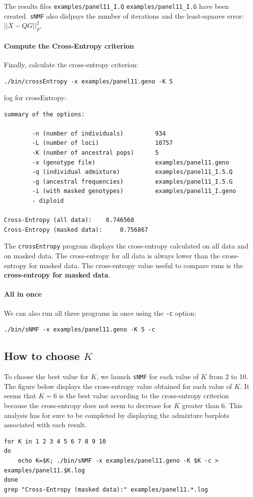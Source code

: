 \documentclass[10pt,a4paper]{article}
\begin{document}
\noindent
The results files \verb|examples/panel11_I.Q| \verb|examples/panel11_I.G| have been created.
{\tt sNMF} also dislpays the number of iterations and the least-squares error: $||X - QG||_F^2$.

\paragraph{Compute the Cross-Entropy criterion}

Finally, calculate the cross-entropy criterion:
\begin{Verbatim}[frame=single]
./bin/crossEntropy -x examples/panel11.geno -K 5
\end{Verbatim}
\noindent
log for crossEntropy:
\begin{Verbatim}[frame=single]
summary of the options:

        -n (number of individuals)         934
        -L (number of loci)                10757
        -K (number of ancestral pops)      5
        -x (genotype file)                 examples/panel11.geno
        -q (individual admixture)          examples/panel11_I.5.Q
        -g (ancestral frequencies)         examples/panel11_I.5.G
        -i (with masked genotypes)         examples/panel11_I.geno
        - diploid

Cross-Entropy (all data):	 0.746568
Cross-Entropy (masked data):	 0.756867
\end{Verbatim}
\noindent
The {\tt crossEntropy} program displays the cross-entropy calculated on all data and on masked data.
The cross-entropy for all data is always lower than the cross-entropy for masked data. The cross-entropy value 
useful to compare runs is the {\bf cross-entropy for masked data}.


\paragraph{All in once}
We can also run all three programs in once using the \verb|-c| option:
\begin{Verbatim}[frame=single]
./bin/sNMF -x examples/panel11.geno -K 5 -c
\end{Verbatim}

\subsection{How to choose $K$}

To choose the best value for $K$, we launch {\tt sNMF} for each value of $K$ from 2 to 10. The figure below displays the cross-entropy value obtained for each value of $K$. It seems that $K=6$ is the best value according to the cross-entropy criterion because the cross-entropy does not seem to decrease for $K$ greater than 6. This analysis has for sure to be completed by displaying the admixture barplots associated with each result. 
\begin{Verbatim}[frame=single]
for K in 1 2 3 4 5 6 7 8 9 10 
do 
	echo K=$K; ./bin/sNMF -x examples/panel11.geno -K $K -c > examples/panel11.$K.log
done
grep "Cross-Entropy (masked data):" examples/panel11.*.log
\end{Verbatim}
\end{document}

